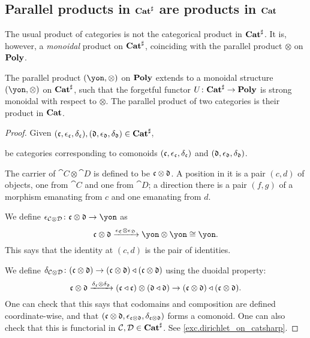 \documentclass[Book-Poly]{subfiles}
\begin{document}
\subsection{Parallel products in $\mathbf{Cat}^\sharp$ are products in $\mathbf{Cat}$}

The usual product of categories is not the categorical product in $\mathbf{Cat}^\sharp$. %
It is, however, a \emph{monoidal} product on $\mathbf{Cat}^\sharp$, coinciding with the parallel product $\otimes$ on $\mathbf{Poly}$.

\begin{proposition}\label{prop.dirichlet_on_catsharp}
The parallel product $(\yon,\otimes)$ on $\mathbf{Poly}$ extends to a monoidal structure $(\yon,\otimes)$ on $\mathbf{Cat}^\sharp$, such that the forgetful functor
$U\colon\mathbf{Cat}^\sharp\to\mathbf{Poly}$
is strong monoidal with respect to $\otimes$.
The parallel product of two categories is their product in $\mathbf{Cat}$.
\end{proposition}
\begin{proof}
Given $(\mathfrak{c},\epsilon_{\mathfrak{c}},\delta_{\mathfrak{c}}),(\mathfrak{d},\epsilon_{\mathfrak{d}},\delta_{\mathfrak{d}})\in\mathbf{Cat}^\sharp$, 

be categories corresponding to comonoids $(\mathfrak{c},\epsilon_{\mathfrak{c}},\delta_{\mathfrak{c}})$ and $(\mathfrak{d},\epsilon_{\mathfrak{d}},\delta_{\mathfrak{d}})$.



The carrier of $\cat{C}\otimes\cat{D}$ is defined to be $\mathfrak{c}\otimes\mathfrak{d}$. A position in it is a pair $(c,d)$ of objects, one from $\cat{C}$ and one from $\cat{D}$; a direction there is a pair $(f,g)$ of a morphism emanating from $c$ and one emanating from $d$. 

We define $\epsilon_{\cat{C}\otimes\cat{D}}\colon\ema{c}\otimes\ema{d}\to\yon$ as
\[
\ema{c}\otimes\ema{d}\To{\epsilon_{\ema{C}}\otimes\epsilon_{\ema{D}}}\yon\otimes\yon\cong\yon.
\]
This says that the identity at $(c,d)$ is the pair of identities.

We define $\delta_{\mathcal{C}\otimes\mathcal{D}}\colon(\mathfrak{c}\otimes\mathfrak{d})\to(\mathfrak{c}\otimes\mathfrak{d})\mathbin{\triangleleft}(\mathfrak{c}\otimes\mathfrak{d})$ using the duoidal property:
\[
\mathfrak{c}\otimes\mathfrak{d}\xrightarrow{\delta_{\mathfrak{c}}\otimes\delta_{\mathfrak{d}}}(\mathfrak{c}\mathbin{\triangleleft}\mathfrak{c})\otimes(\mathfrak{d}\mathbin{\triangleleft}\mathfrak{d})\to(\mathfrak{c}\otimes\mathfrak{d})\mathbin{\triangleleft}(\mathfrak{c}\otimes\mathfrak{d}).
\]
One can check that this says that codomains and composition are defined coordinate-wise, and that $(\mathfrak{c}\otimes\mathfrak{d},\epsilon_{\mathfrak{c}\otimes\mathfrak{d}},\delta_{\mathfrak{c}\otimes\mathfrak{d}})$ forms a comonoid. One can also check that this is functorial in $\mathcal{C},\mathcal{D}\in\mathbf{Cat}^\sharp$. See \cref{exc.dirichlet_on_catsharp}.
\end{proof}
\end{document}
